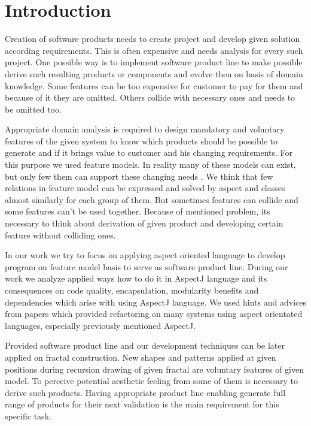 \documentclass[11pt,slovak,a4paper,twoside]{article}
\begin{document}
\section{Introduction} \label{introduction}

Creation of software products needs to create project and develop given solution according requirements. This is often expensive and needs analysis for every such project. One possible way is to implement software product line to make possible derive such resulting products or components and evolve then on basis of domain knowledge. Some features can be too expensive for customer to pay for them and because of it they are omitted. Others collide with necessary ones and needs to be omitted too. 

Appropriate domain analysis is required to design mandatory and voluntary features of the given system to know which products should be possible to generate and if it brings value to customer and his changing requirements. For this purpose we used feature models. In reality many of these models can exist, but only few them can support these changing needs \cite{beuche_software_2006}. We think that few relations in feature model can be expressed and solved by aspect and classes almost similarly for each group of them. But sometimes features can collide and some features can't be used together. Because of mentioned problem, its necessary to think about derivation of given product and developing certain feature without colliding ones.  

In our work we try to focus on applying aspect oriented language to develop program on feature model basis to serve as software product line. During our work we analyze applied ways how to do it in AspectJ language and its consequences on code quality, encapsulation, modularity benefits and dependencies which arise with using AspectJ language. We used hints and advices from papers which provided refactoring on many systems using aspect orientated languages, especially previously mentioned AspectJ.

Provided software product line and our development techniques can be later applied on fractal construction. New shapes and patterns applied at given positions during recursion drawing of given fractal are voluntary features of given model. To perceive potential aesthetic feeling from some of them is necessary to derive such products. Having appropriate product line enabling generate full range of products for their next validation is the main requirement for this specific task.
\end{document}
